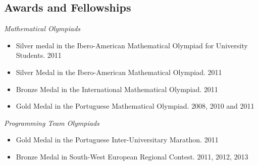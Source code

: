 \documentclass[margin, 10pt]{res} %
\begin{document}
\begin{resume}
\section{Awards and Fellowships}

{\sl Mathematical Olympiads}
\begin{itemize} \itemsep -2pt %
\item Silver medal in the Ibero-American Mathematical Olympiad for
University Students. {\tiny 2011}
\item Silver Medal in the Ibero-American Mathematical Olympiad. {\tiny 2011}
\item Bronze Medal in the International Mathematical Olympiad. {\tiny 2011}
\item Gold Medal in the Portuguese Mathematical Olympiad. {\tiny 2008, 2010 and 2011}
\end{itemize}


\vspace{0.2cm}

{\sl Programming Team Olympiads}
\begin{itemize} 
\item Gold Medal in the Portuguese Inter-Universitary Marathon. {\tiny 2011}
\item Bronze Medal in South-West European Regional Contest. {\tiny 2011, 2012, 2013}
\end{itemize} 



\end{resume}
\end{document}
